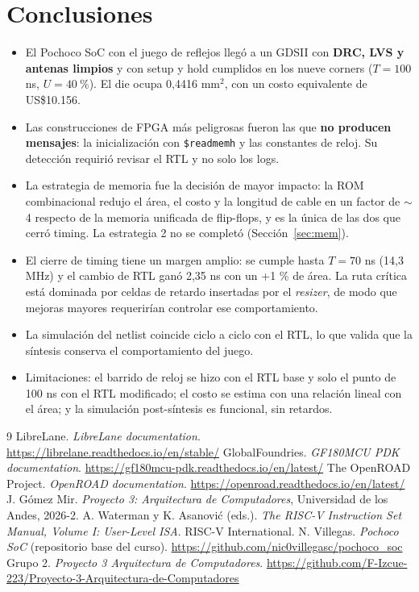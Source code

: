 \documentclass[11pt,letterpaper]{article}
\newcommand{\code}[1]{\texttt{#1}}
\begin{document}
\section{Conclusiones}

\begin{itemize}
  \item El Pochoco SoC con el juego de reflejos llegó a un GDSII con \textbf{DRC, LVS y antenas limpios} y con setup y hold cumplidos en los nueve corners ($T=100$ ns, $U=40~\%$). El die ocupa 0,4416 mm$^2$, con un costo equivalente de US\$10.156.
  \item Las construcciones de FPGA más peligrosas fueron las que \textbf{no producen mensajes}: la inicialización con \code{\$readmemh} y las constantes de reloj. Su detección requirió revisar el RTL y no solo los logs.
  \item La estrategia de memoria fue la decisión de mayor impacto: la ROM combinacional redujo el área, el costo y la longitud de cable en un factor de $\sim$4 respecto de la memoria unificada de flip-flops, y es la única de las dos que cerró timing. La estrategia 2 no se completó (Sección~\ref{sec:mem}).
  \item El cierre de timing tiene un margen amplio: se cumple hasta $T=70$ ns (14,3 MHz) y el cambio de RTL ganó 2,35 ns con un +1 \% de área. La ruta crítica está dominada por celdas de retardo insertadas por el \textit{resizer}, de modo que mejoras mayores requerirían controlar ese comportamiento.
  \item La simulación del netlist coincide ciclo a ciclo con el RTL, lo que valida que la síntesis conserva el comportamiento del juego.
  \item Limitaciones: el barrido de reloj se hizo con el RTL base y solo el punto de 100 ns con el RTL modificado; el costo se estima con una relación lineal con el área; y la simulación post-síntesis es funcional, sin retardos.
\end{itemize}

\begin{thebibliography}{9}
 LibreLane. \textit{LibreLane documentation}. \url{https://librelane.readthedocs.io/en/stable/}
 GlobalFoundries. \textit{GF180MCU PDK documentation}. \url{https://gf180mcu-pdk.readthedocs.io/en/latest/}
 The OpenROAD Project. \textit{OpenROAD documentation}. \url{https://openroad.readthedocs.io/en/latest/}
 J. Gómez Mir. \textit{Proyecto 3: Arquitectura de Computadores}, Universidad de los Andes, 2026-2.
 A. Waterman y K. Asanović (eds.). \textit{The RISC-V Instruction Set Manual, Volume I: User-Level ISA}. RISC-V International.
 N. Villegas. \textit{Pochoco SoC} (repositorio base del curso). \url{https://github.com/nic0villegasc/pochoco_soc}
 Grupo 2. \textit{Proyecto 3 Arquitectura de Computadores}. \url{https://github.com/F-Izcue-223/Proyecto-3-Arquitectura-de-Computadores}
\end{thebibliography}
\end{document}
